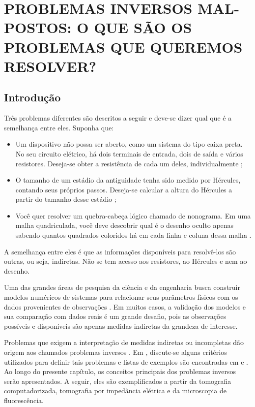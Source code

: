 \section{PROBLEMAS INVERSOS MAL-POSTOS: O QUE SÃO OS PROBLEMAS QUE QUEREMOS RESOLVER?}\label{sec:illposed}

\subsection{Introdução}

Três problemas diferentes são descritos a seguir e deve-se dizer qual que é a semelhança entre eles. Suponha que:
\begin{itemize}
\item Um dispositivo não possa ser aberto, como um sistema do tipo caixa preta. No seu circuito elétrico, há dois terminais de entrada, dois de saída e vários resistores. Deseja-se obter a resistência de cada um deles, individualmente \cite{ufabcDC1, ufabcDC2};
\item O tamanho de um estádio da antiguidade tenha sido medido por Hércules, contando seus próprios passos. Deseja-se calcular a altura do Hércules a partir do tamanho desse estádio \cite{ufabcDC6}; 
\item Você quer resolver um quebra-cabeça lógico chamado de nonograma. Em uma malha quadriculada, você deve descobrir qual é o desenho oculto apenas sabendo quantos quadrados coloridos há em cada linha e coluna dessa malha \cite{ufabcDC4}.
\end{itemize}
A semelhança entre eles é que as informações disponíveis para resolvê-los são outras, ou seja, indiretas. Não se tem acesso aos resistores, ao Hércules e nem ao desenho.

Uma das grandes áreas de pesquisa da ciência e da engenharia busca construir modelos numéricos de sistemas para relacionar seus parâmetros físicos com os dados provenientes de observações \cite[pág. 1]{aster2019parameter}. Em muitos casos, a validação dos modelos e sua comparação com dados reais é um grande desafio, pois as observações possíveis e disponíveis são apenas medidas indiretas da grandeza de interesse. 

Problemas que exigem a interpretação de medidas indiretas ou incompletas dão origem aos chamados problemas inversos \cite[pág. xi]{Mueller2012}. Em \cite{Kabanikhin2008}, discute-se alguns critérios utilizados para definir tais problemas e listas de exemplos são encontradas em \cite{aster2019parameter} e \cite[Capítulo 1]{baumeister2005topics}. Ao longo do presente capítulo, os conceitos principais dos problemas inversos serão apresentados. A seguir, eles são exemplificados a partir da tomografia computadorizada, tomografia por impedância elétrica e da microscopia de fluorescência. 

